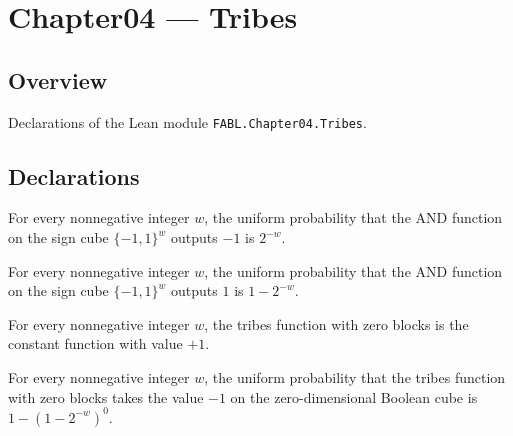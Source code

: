 \chapter{Chapter04 — Tribes}
\section{Overview}

Declarations of the Lean module \texttt{FABL.Chapter04.Tribes}.

\section{Declarations}

\begin{theorem}
\label{FABL.uniformProbability_andFunction_eq_neg_one}
\leanok
{}
For every nonnegative integer $w$, the uniform probability that the AND function on the
sign cube $\{-1,1\}^w$ outputs $-1$ is $2^{-w}$.
\end{theorem}

\begin{theorem}
\label{FABL.uniformProbability_andFunction_eq_one}
\leanok
{}
For every nonnegative integer $w$, the uniform probability that the AND function on the
sign cube $\{-1,1\}^w$ outputs $1$ is $1-2^{-w}$.
\end{theorem}

\begin{theorem}
\label{FABL.tribes_zero}
\leanok
{}
For every nonnegative integer $w$, the tribes function with zero blocks is the constant
function with value $+1$.
\end{theorem}

\begin{theorem}
\label{FABL.tribes_neg_one_probability_zero}
\leanok
{}
For every nonnegative integer $w$, the uniform probability that the tribes function with
zero blocks takes the value $-1$ on the zero-dimensional Boolean cube is
$1-(1-2^{-w})^0$.
\end{theorem}

